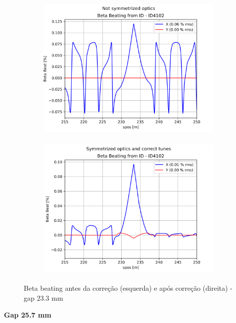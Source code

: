 \documentclass[a4paper,12pt]{article}
\begin{document}
\begin{figure}[H]
\begin{subfigure}{0.5\textwidth}
\includegraphics[width=0.9\linewidth, height=7cm]{figs/phase25 gap23 uncorrected-optics.png} 
\label{fig:subim12523}
\end{subfigure}
\begin{subfigure}{0.5\textwidth}
\includegraphics[width=0.9\linewidth, height=7cm]{figs/phase25 gap23 corrected-optics-tunes.png}
\label{fig:subim22523}
\end{subfigure}
\caption{Beta beating antes da correção (esquerda) e após correção (direita) - gap 23.3 mm}
\label{fig:bb25_23}
\end{figure}

\textbf{Gap 25.7 mm} \\
\end{document}
